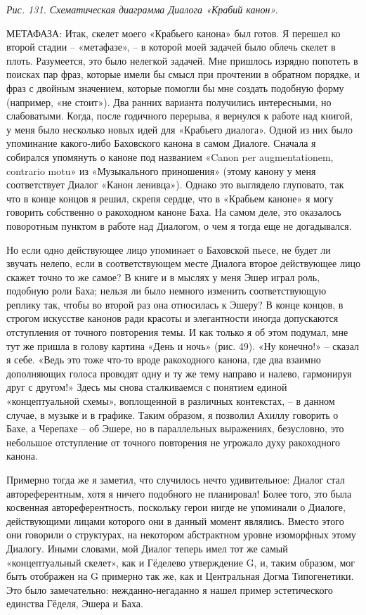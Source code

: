 \documentclass[../main.tex]{subfiles}
\begin{document}
\emph{Рис. 131. Схематическая диаграмма Диалога «Крабий канон».}

МЕТАФАЗА: Итак, скелет моего «Крабьего канона» был готов. Я перешел ко второй стадии \--- «метафазе», \--- в которой моей задачей было облечь скелет в плоть. Разумеется, это было нелегкой задачей. Мне пришлось изрядно попотеть в поисках пар фраз, которые имели бы смысл при прочтении в обратном порядке, и фраз с двойным значением, которые помогли бы мне создать подобную форму (например, «не стоит»). Два ранних варианта получились интересными, но слабоватыми. Когда, после годичного перерыва, я вернулся к работе над книгой, у меня было несколько новых идей для «Крабьего диалога». Одной из них было упоминание какого-либо Баховского канона в самом Диалоге. Сначала я собирался упомянуть о каноне под названием «Canon per augmentationem, contrario motu» из «Музыкального приношения» (этому канону у меня соответствует Диалог «Канон ленивца»). Однако это выглядело глуповато, так что в конце концов я решил, скрепя сердце, что в «Крабьем каноне» я могу говорить собственно о ракоходном каноне Баха. На самом деле, это оказалось поворотным пунктом в работе над Диалогом, о чем я тогда еще не догадывался.

Но если одно действующее лицо упоминает о Баховской пьесе, не будет ли звучать нелепо, если в соответствующем месте Диалога второе действующее лицо скажет точно то же самое? В книге и в мыслях у меня Эшер играл роль, подобную роли Баха; нельзя ли было немного изменить соответствующую реплику так, чтобы во второй раз она относилась к Эшеру? В конце концов, в строгом искусстве канонов ради красоты и элегантности иногда допускаются отступления от точного повторения темы. И как только я об этом подумал, мне тут же пришла в голову картина «День и ночь» (рис. 49). «Ну конечно!» \--- сказал я себе. «Ведь это тоже что-то вроде ракоходного канона, где два взаимно дополняющих голоса проводят одну и ту же тему направо и налево, гармонируя друг с другом!» Здесь мы снова сталкиваемся с понятием единой «концептуальной схемы», воплощенной в различных контекстах, \--- в данном случае, в музыке и в графике. Таким образом, я позволил Ахиллу говорить о Бахе, а Черепахе \--- об Эшере, но в параллельных выражениях, безусловно, это небольшое отступление от точного повторения не угрожало духу ракоходного канона.

Примерно тогда же я заметил, что случилось нечто удивительное: Диалог стал автореферентным, хотя я ничего подобного не планировал! Более того, это была косвенная автореферентность, поскольку герои нигде не упоминали о Диалоге, действующими лицами которого они в данный момент являлись. Вместо этого они говорили о структурах, на некотором абстрактном уровне изоморфных этому Диалогу. Иными словами, мой Диалог теперь имел тот же самый «концептуальный скелет», как и Гёделево утверждение G, и, таким образом, мог быть отображен на G примерно так же, как и Центральная Догма Типогенетики. Это было замечательно: нежданно-негаданно я нашел пример эстетического единства Гёделя, Эшера и Баха.
\end{document}
